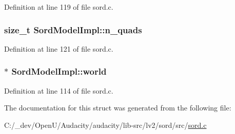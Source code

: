 Definition at line 119 of file sord.\+c.

\subsubsection[{\texorpdfstring{n\+\_\+quads}{n_quads}}]{\setlength{\rightskip}{0pt plus 5cm}size\+\_\+t Sord\+Model\+Impl\+::n\+\_\+quads}\hypertarget{struct_sord_model_impl_aa077b03efcbee4ed3acee0e8c5316b5a}{}\label{struct_sord_model_impl_aa077b03efcbee4ed3acee0e8c5316b5a}


Definition at line 121 of file sord.\+c.

\subsubsection[{\texorpdfstring{world}{world}}]{$\ast$ Sord\+Model\+Impl\+::world}\hypertarget{struct_sord_model_impl_ab9a23ed686b1386ea310a3192e6d9cc5}{}\label{struct_sord_model_impl_ab9a23ed686b1386ea310a3192e6d9cc5}


Definition at line 114 of file sord.\+c.



The documentation for this struct was generated from the following file\+:\begin{DoxyCompactItemize}
\item 
C\+:/\+\_\+dev/\+Open\+U/\+Audacity/audacity/lib-\/src/lv2/sord/src/\hyperlink{sord_8c}{sord.\+c}\end{DoxyCompactItemize}
